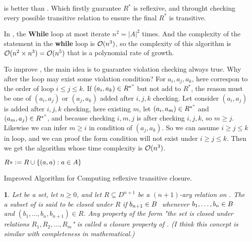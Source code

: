  is better than .
Which firstly guarantee $R^\ast$ is reflexive, and throught checking every possible transitive relation to ensure
the final $R^\ast$ is transitive.

In , the {\bf While} loop at most iterate 
$n^2 = |A|^2$ times. And the complexity of the statement in the {\bf while} loop is $\bigo(n^3)$, so
the complexity of this algorithm is $\bigo(n^2\times n^3) = \bigo(n^5)$ that is a polynomial rate of growth.

To improve , the main idea is
to guarantee violation checking always true. Why after the loop may exist some 
violation condition? For $a_i, a_j, a_k$, here correspon to the order of loop $i\le j\le k$.
If $(a_i, a_k)\in R^{\ast"}$ but not add to $R^\ast$, the reason must be one of 
$(a_i, a_j)$ or $(a_j, a_k)$ added after 
$i, j, k$ checking. Let consider $(a_i, a_j)$ is added after $i, j, k$ checking,
here existing $m$, let $(a_i, a_m)\in R^{\ast"}$ and $(a_m, a_j)\in R^{\ast"}$,
and because checking $i, m, j$ is after checking $i, j, k$, so $m\ge j$.
Likewise we can infer $m\ge i$ in condition of $(a_j, a_k)$.
So we can assume $i\ge j \le k$ in loop, and we can proof the form condition 
will not exist under $i\ge j\le k$. Then we get the algorithm whose time complexity is
$\bigo(n^3)$.

\begin{algorithm}[H]
\begin{algorithmic}[1]
\Init
\State $R\ast := R\cup \{(a, a): a\in A\}$
\EndInit
{}
\State{}
\EndIf
\EndFor
\EndFor
\end{algorithmic}
\caption{Improved Algorithm for Computing reflexive transitive closure.}
\end{algorithm}

\newtheorem{closure-def}[theorem_root]{}
\begin{closure-def}
\label{def:closure_definition}
Let \ud be a set, let $n\ge 0$, and let $R\subseteq D^{n+1}$ be a $(n+1)$-ary relation on
\ud. The a subset \ub of \ud is said to be closed under $R$ if $b_{n+1}\in\ub$ whenever
$b_1,\ldots,b_n\in\ub$ and $(b_1,\ldots,b_n, b_{n+1})\in R$. Any property of the form
"the set \ub is closed under relations $R_1, R_2,\ldots,R_m$" is called a closure 
property of \ub. (I think this concept is similar with completeness in mathematical.)
\end{closure-def}

